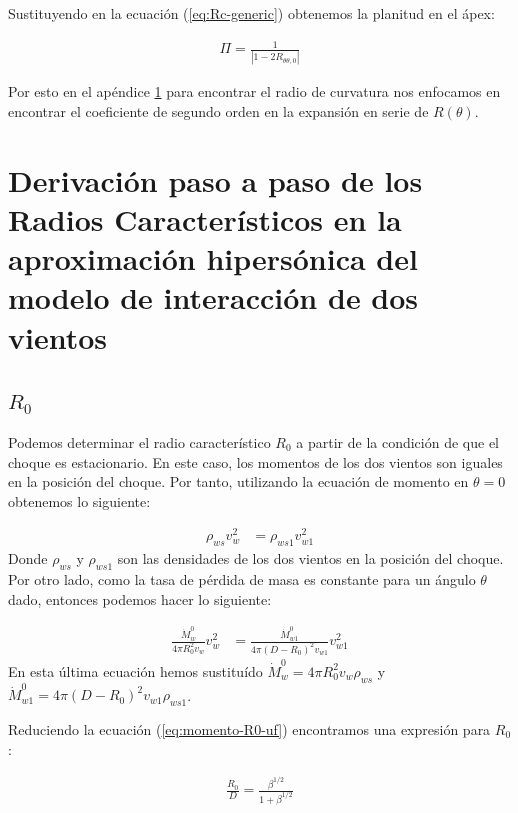 Sustituyendo en la ecuación (\ref{eq:Rc-generic}) obtenemos la planitud en el ápex:

\begin{align}
  \Pi = \frac{1}{\left|1 - 2R_{\theta \theta, 0}\right|}\label{eq:Rc-nose}
\end{align}

Por esto en el apéndice \ref{app:derivation-radii} para encontrar el radio de curvatura nos enfocamos en encontrar
el coeficiente de segundo orden en la expansión en serie de $R(\theta)$.

\chapter{Derivación paso a paso de los Radios Característicos en la aproximación
  hipersónica del modelo de interacción de dos vientos}
\label{app:derivation-radii}

\section{$R_0$}
Podemos determinar el radio característico $R_0$ a partir de la condición de que el choque es estacionario. En este caso,
los momentos de los dos vientos son iguales en la posición del choque. Por tanto, utilizando la ecuación de momento en $\theta=0$
obtenemos lo siguiente:

\begin{align}
  \rho_{ws} v^2_w &= \rho_{ws1} v^2_{w1}
\end{align}
Donde $\rho_{ws}$ y $\rho_{ws1}$ son las densidades de los dos vientos en la posición del choque. Por otro lado, como la tasa de pérdida
de masa es constante para un ángulo $\theta$ dado, entonces podemos hacer lo siguiente:

\begin{align}
  \frac{\dot{M}^0_w}{4\pi R_0^2 v_w}v^2_w &= \frac{\dot{M}^0_{w1}}{4\pi\left(D-R_0\right)^2v_{w1}}v^2_{w1} \label{eq:momento-R0-uf}
\end{align}
En esta última ecuación hemos sustituído $\dot{M}^0_w = 4\pi R_0^2 v_w \rho_{ws}$ y \\
$\dot{M}^0_{w1} = 4\pi \left(D - R_0\right)^2 v_{w1} \rho_{ws1}$.

Reduciendo la ecuación (\ref{eq:momento-R0-uf}) encontramos una expresión para $R_0$:

\begin{align}
  \frac{R_0}{D} = \frac{\beta^{1/2}}{1+\beta^{1/2}}
\end{align}

